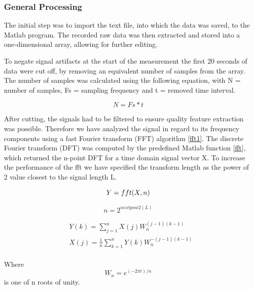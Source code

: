 \subsubsection{General Processing}
The initial step was to import the text file, into which the data was saved, to the Matlab program. The recorded raw data was then extracted and stored into a one-dimensional array, allowing for further editing.



To negate signal artifacts at the start of the measurement the first 20 seconds of data were cut off, by removing an equivalent number of samples from the array. The number of samples was calculated using the following equation, with N = number of samples, Fs = sampling frequency and t = removed time interval.

\begin{equation}\label{NumberSamples}
N = Fs * t
\end{equation} 

After cutting, the signals had to be filtered to ensure quality feature extraction was possible. Therefore we have analyzed the signal in regard to its frequency components using a fast Fourier transform (FFT) algorithm \ref{fft1}. The discrete Fourier transform (DFT) was computed by the predefined Matlab function \ref{fft}, which returned the n-point DFT for a time domain signal vector X. To increase the performance of the fft we have specified the transform length as the power of 2 value closest to the signal length L. 

\begin{equation}\label{fft}
Y = fft(X,n) \\
\end{equation}

\begin{equation}
n = 2^{nextpow2(L)}
\end{equation}

\begin{align}\label{fft1}
& Y(k) = \sum\limits_{j=1}^n X(j) W_{n}^{(j-1)(k-1)} \\
& X(j) = \frac{1}{n} \sum\limits_{k=1}^n Y(k) W_{n}^{-(j-1)(k-1)} \\
\end{align} 

Where
\begin{equation}
W_{n} = e^{(-2\pi t)/n}
\end{equation}
is one of n roots of unity.\\

